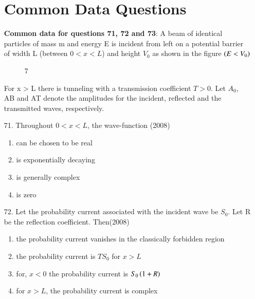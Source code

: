 \documentclass[journal]{IEEEtran}
\begin{document}
\begin{enumerate}
      \begin{figure}[!ht]
        \centering
    \end{figure}
    \begin{figure}[!ht]
      \centering
       \end{figure}
      
   
    \section{Common Data Questions}
    \textbf{Common data for questions 71, 72 and 73}: A beam of identical particles of mass m and energy E is incident from left on a potential barrier of width L (between $0 < x < L$) and height $V_0$ as shown in the figure $\left(E < V_0\right)$
    \begin{figure}[!ht]
      \centering
      \caption{ 7}
      \label{fig 7}
  \end{figure}
    For x > L there is tunneling with a transmission coefficient $T > 0$. Let $A_0$, AB and AT denote the amplitudes for the incident, reflected and the transmitted waves, respectively.
    \item[71.] Throughout $0 < x < L$, the wave-function \hfill (2008)
      \begin{enumerate}[label=(\Alph*)]
        \item can be chosen to be real
        \item is exponentially decaying
        \item is generally complex
        \item  is zero
      \end{enumerate}
    \item[72.]  Let the probability current associated with the incident wave be $S_0$. Let R be the reflection coefficient. Then\hfill (2008)
      \begin{enumerate}[label=(\Alph*)]
        \item the probability current vanishes in the classically forbidden region
        \item the probability current is $TS_0$ for $x > L$
        \item for, $x < 0$ the probability current is $S_0\left(1 + R\right)$
        \item  for $x > L$, the probability current is complex

\end{enumerate}
\end{enumerate}
\end{document}
